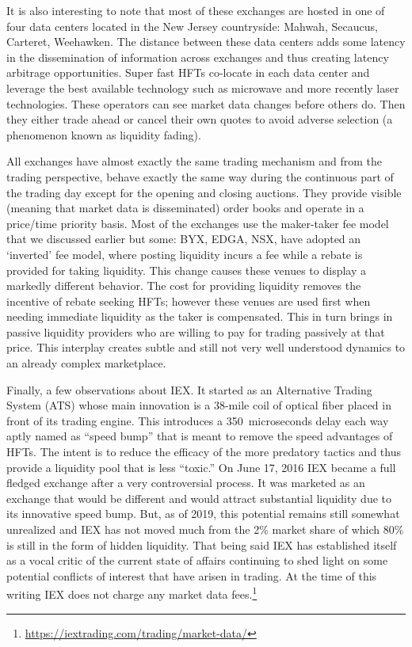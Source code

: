 It is also interesting to note that most of these exchanges are hosted in one of four data centers located in the New Jersey countryside: Mahwah, Secaucus, Carteret, Weehawken. The distance between these data centers adds some latency in the dissemination of information across exchanges and thus creating latency arbitrage opportunities. Super fast HFTs co-locate in each data center and leverage the best available technology such as microwave and more recently laser technologies. These operators can see market data changes before others do. Then they either trade ahead or cancel their own quotes to avoid adverse selection (a phenomenon known as liquidity fading).


All exchanges have almost exactly the same trading mechanism and from the trading perspective, behave exactly the same way during the continuous part of the trading day except for the opening and closing auctions. They provide visible (meaning that market data is disseminated) order books and operate in a price/time priority basis. Most of the exchanges use the maker-taker fee model that we discussed earlier but some: BYX, EDGA, NSX, have adopted an `inverted' fee model, where posting liquidity incurs a fee while a rebate is provided for taking liquidity. This change causes these venues to display a markedly different behavior. The cost for providing liquidity removes the incentive of rebate seeking HFTs; however  these venues are used first when needing immediate liquidity as the taker is compensated. This in turn brings in passive liquidity providers who are willing to pay for trading passively at that price. This interplay creates subtle and still not very well understood dynamics to an already complex marketplace.


Finally, a few observations about IEX. It started as an Alternative Trading System (ATS) whose main innovation is a 38-mile coil of optical fiber placed in front of its trading engine. This introduces a 350~microseconds delay each way aptly named as ``speed bump'' that is meant to remove the speed advantages of HFTs. The intent is to reduce the efficacy of the more predatory tactics and thus provide a liquidity pool that is less ``toxic.'' On June 17, 2016 IEX became a full fledged exchange after a very controversial process. It was marketed as an exchange that would be different and would attract substantial liquidity due to its innovative speed bump. But, as of 2019, this potential remains still somewhat unrealized and IEX has not moved much from the 2\% market share of which 80\% is still in the form of hidden liquidity. That being said IEX has established itself as a vocal critic of the current state of affairs continuing to shed light on some potential conflicts of interest that have arisen in trading. At the time of this writing IEX does not charge any market data fees.\footnote{\url{https://iextrading.com/trading/market-data/}} \twomedskip



